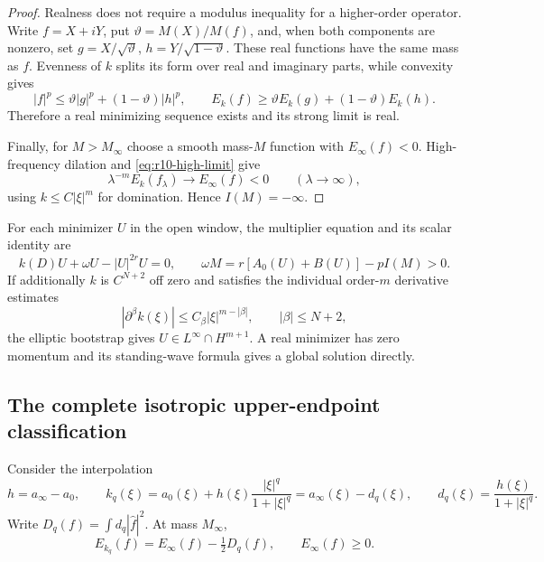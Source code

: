 \begin{proof}
Realness does not require a modulus inequality for a higher-order
operator. Write $f=X+iY$, put $\vartheta=M(X)/M(f)$, and, when both
components are nonzero, set $g=X/\sqrt\vartheta$,
$h=Y/\sqrt{1-\vartheta}$. These real functions have the same mass as
$f$. Evenness of $k$ splits its form over real and imaginary parts,
while convexity gives
\[
 |f|^p\le\vartheta|g|^p+(1-\vartheta)|h|^p,
 \qquad E_k(f)\ge\vartheta E_k(g)+(1-\vartheta)E_k(h).
\]
Therefore a real minimizing sequence exists and its strong limit is real.

Finally, for $M>M_\infty$ choose a smooth mass-$M$ function with
$E_\infty(f)<0$. High-frequency dilation and
\eqref{eq:r10-high-limit} give
\[
 \lambda^{-m}E_k(f_\lambda)\longrightarrow E_\infty(f)<0
 \qquad(\lambda\longrightarrow\infty),
\]
using $k\le C|\xi|^m$ for domination. Hence $I(M)=-\infty$.
\end{proof}

For each minimizer $U$ in the open window, the multiplier equation and
its scalar identity are
\begin{equation}\label{eq:r10-multiplier}
 k(D)U+\omega U-|U|^{2r}U=0,
 \qquad \omega M=r[A_0(U)+B(U)]-pI(M)>0.
\end{equation}
If additionally $k$ is $C^{N+2}$ off zero and satisfies the individual
order-$m$ derivative estimates
\[
 |\partial^\beta k(\xi)|\le C_\beta|\xi|^{m-|\beta|},
 \qquad |\beta|\le N+2,
\]
the elliptic bootstrap gives $U\in L^\infty\cap H^{m+1}$. A real
minimizer has zero momentum and its standing-wave formula gives a
global solution directly.

\subsection{The complete isotropic upper-endpoint classification}

Consider the interpolation
\begin{equation}\label{eq:r10-interpolation}
 h=a_\infty-a_0,\qquad
 k_q(\xi)=a_0(\xi)+h(\xi)\frac{|\xi|^q}{1+|\xi|^q}
         =a_\infty(\xi)-d_q(\xi),\qquad
 d_q(\xi)=\frac{h(\xi)}{1+|\xi|^q}.
\end{equation}
Write $D_q(f)=\int d_q|\widehat f|^2$. At mass $M_\infty$,
\begin{equation}\label{eq:r10-endpoint-energy}
 E_{k_q}(f)=E_\infty(f)-\tfrac12D_q(f),\qquad E_\infty(f)\ge0.
\end{equation}

